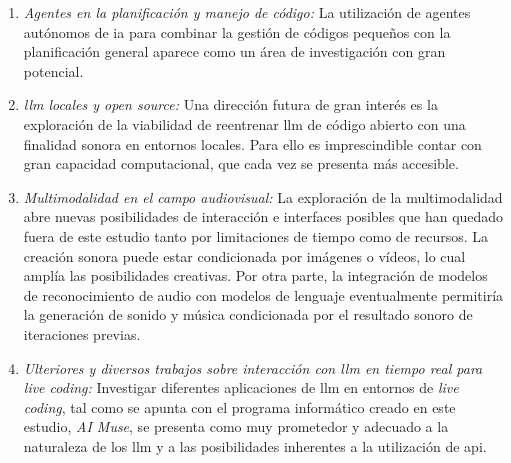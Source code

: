 \begin{enumerate}
\item \textit{Agentes en la planificación y manejo de código:} La utilización de agentes autónomos de \gls{ia} para combinar la gestión de códigos pequeños con la planificación general aparece como un área de investigación con gran potencial.

\item \textit{\gls{llm} locales y open source:} Una dirección futura de gran interés es la exploración de la viabilidad de reentrenar \gls{llm} de código abierto con una finalidad sonora en entornos locales. Para ello es imprescindible contar con gran capacidad computacional, que cada vez se presenta más accesible.

\item \textit{Multimodalidad en el campo audiovisual:} La exploración de la multimodalidad abre nuevas posibilidades de interacción e interfaces posibles que han quedado fuera de este estudio tanto por limitaciones de tiempo como de recursos. La creación sonora puede estar condicionada por imágenes o vídeos, lo cual amplía las posibilidades creativas. Por otra parte, la integración de modelos de reconocimiento de audio con modelos de lenguaje eventualmente permitiría la generación de sonido y música condicionada por el resultado sonoro de iteraciones previas.

\item \textit{Ulteriores y diversos trabajos sobre interacción con \gls{llm} en tiempo real para \emph{live coding}:} Investigar diferentes aplicaciones de \gls{llm} en entornos de \emph{live coding}, tal como se apunta con el programa informático creado en este estudio, \emph{AI Muse}, se presenta como muy prometedor y adecuado a la naturaleza de los \gls{llm} y a las posibilidades inherentes a la utilización de \gls{api}.

\end{enumerate}
